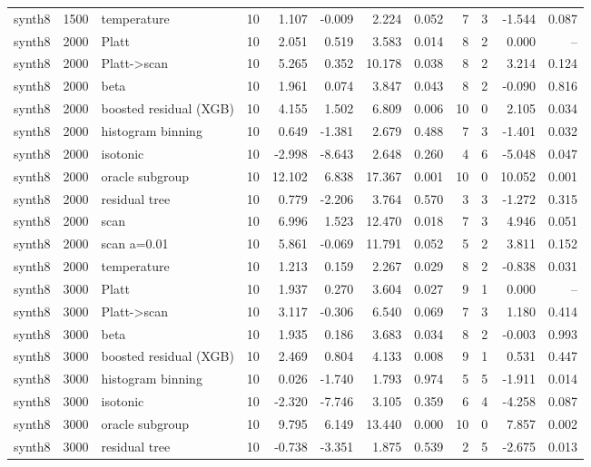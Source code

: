 \begin{tabular}{lllrrrrrrrrr}
synth8 & 1500 & temperature & 10 & 1.107 & -0.009 & 2.224 & 0.052 & 7 & 3 & -1.544 & 0.087 \\
synth8 & 2000 & Platt & 10 & 2.051 & 0.519 & 3.583 & 0.014 & 8 & 2 & 0.000 & -- \\
synth8 & 2000 & Platt->scan & 10 & 5.265 & 0.352 & 10.178 & 0.038 & 8 & 2 & 3.214 & 0.124 \\
synth8 & 2000 & beta & 10 & 1.961 & 0.074 & 3.847 & 0.043 & 8 & 2 & -0.090 & 0.816 \\
synth8 & 2000 & boosted residual (XGB) & 10 & 4.155 & 1.502 & 6.809 & 0.006 & 10 & 0 & 2.105 & 0.034 \\
synth8 & 2000 & histogram binning & 10 & 0.649 & -1.381 & 2.679 & 0.488 & 7 & 3 & -1.401 & 0.032 \\
synth8 & 2000 & isotonic & 10 & -2.998 & -8.643 & 2.648 & 0.260 & 4 & 6 & -5.048 & 0.047 \\
synth8 & 2000 & oracle subgroup & 10 & 12.102 & 6.838 & 17.367 & 0.001 & 10 & 0 & 10.052 & 0.001 \\
synth8 & 2000 & residual tree & 10 & 0.779 & -2.206 & 3.764 & 0.570 & 3 & 3 & -1.272 & 0.315 \\
synth8 & 2000 & scan & 10 & 6.996 & 1.523 & 12.470 & 0.018 & 7 & 3 & 4.946 & 0.051 \\
synth8 & 2000 & scan a=0.01 & 10 & 5.861 & -0.069 & 11.791 & 0.052 & 5 & 2 & 3.811 & 0.152 \\
synth8 & 2000 & temperature & 10 & 1.213 & 0.159 & 2.267 & 0.029 & 8 & 2 & -0.838 & 0.031 \\
synth8 & 3000 & Platt & 10 & 1.937 & 0.270 & 3.604 & 0.027 & 9 & 1 & 0.000 & -- \\
synth8 & 3000 & Platt->scan & 10 & 3.117 & -0.306 & 6.540 & 0.069 & 7 & 3 & 1.180 & 0.414 \\
synth8 & 3000 & beta & 10 & 1.935 & 0.186 & 3.683 & 0.034 & 8 & 2 & -0.003 & 0.993 \\
synth8 & 3000 & boosted residual (XGB) & 10 & 2.469 & 0.804 & 4.133 & 0.008 & 9 & 1 & 0.531 & 0.447 \\
synth8 & 3000 & histogram binning & 10 & 0.026 & -1.740 & 1.793 & 0.974 & 5 & 5 & -1.911 & 0.014 \\
synth8 & 3000 & isotonic & 10 & -2.320 & -7.746 & 3.105 & 0.359 & 6 & 4 & -4.258 & 0.087 \\
synth8 & 3000 & oracle subgroup & 10 & 9.795 & 6.149 & 13.440 & 0.000 & 10 & 0 & 7.857 & 0.002 \\
synth8 & 3000 & residual tree & 10 & -0.738 & -3.351 & 1.875 & 0.539 & 2 & 5 & -2.675 & 0.013 \\

\end{tabular}
